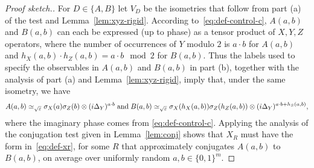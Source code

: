 \begin{proof}[Proof sketch.]
For $D\in\{A,B\}$ let $V_D$ be the isometries that follow from part (a) of the test and Lemma~\ref{lem:xyz-rigid}.
According to~\eqref{eq:def-control-c}, $A(a,b)$ and $B(a,b)$ can each be expressed (up to phase) as a tensor product of $X,Y,Z$ operators, where the number of occurrences of $Y$ modulo $2$ is $a\cdot b$ for $A(a,b)$ and  $h_X(a,b)\cdot h_Z(a,b) = a\cdot b\mod 2$ for $B(a,b)$. Thus the labels used to specify the observables in $A(a,b)$ and $B(a,b)$ in part (b), together with the analysis of part (a) and Lemma~\ref{lem:xyz-rigid}, imply that, under the same isometry, we  have
$$A(a,b) \simeq_{\sqrt{\varepsilon}} \sigma_X(a)\sigma_Z(b) \otimes (i\Delta_Y)^{a\cdot b}
\;\text{and}\;
 B(a,b) \simeq_{\sqrt{\varepsilon}} \sigma_X(h_X(a,b)) \sigma_Z(h_Z(a,b)) \otimes (i\Delta_Y)^{a\cdot b + h_S(a,b)},$$
where the imaginary phase comes from \eqref{eq:def-control-c}. 
Applying the analysis of the conjugation test given in Lemma~\ref{lem:conj} shows that $X_R$ must have the form in~\eqref{eq:def-xr}, for some $R$ that approximately conjugates $A(a,b)$ to $B(a,b)$, on average over uniformly random $a,b\in\{0,1\}^m$.


\end{proof}
